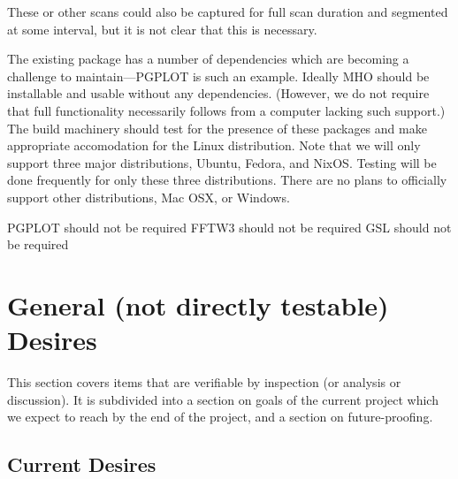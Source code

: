 \TBC{}

These or other scans could also be captured for full scan duration and
segmented at some interval, but it is not clear that this is necessary.

The existing package has a number of dependencies which are becoming
a challenge to maintain---\acs{PGPLOT} is such an example.  Ideally
\acs{MHO} should be installable and usable without any dependencies.
(However, we do not require that full functionality necessarily follows
from a computer lacking such support.)  The build machinery should test
for the presence of these packages and make appropriate accomodation for
the Linux distribution. Note that we will only support three major distributions,
Ubuntu, Fedora, and NixOS. Testing will be done frequently for only these
three distributions. There are no plans to officially support other 
distributions, Mac OSX, or Windows.

%
%
\newsavebox{\xpgplot}
  \addtocounter{req}{1}
\newsavebox{\xfftwthree}
  \addtocounter{req}{1}
\addtocounter{req}{-2}
%
\begin{description}
 \acs{PGPLOT} should not be required
 \acs{FFTW3} should not be required
 \acs{GSL} should not be required
\end{description}

\section{General (not directly testable) Desires}
\label{sec:desires}

This section covers items that are verifiable by inspection (or analysis
or discussion).  It is subdivided into a section on goals of the current
project which we expect to reach by the end of the project, and a section
on future-proofing.

\subsection{Current Desires}
\label{sec:currentdesires}

